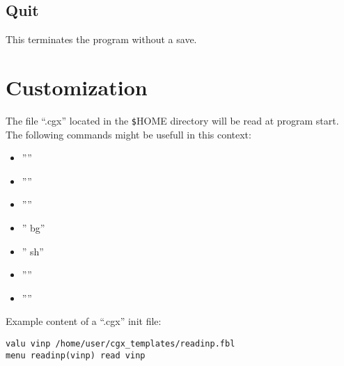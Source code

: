 \documentclass{article}
\begin{document}
\subsection{\label{Quit}Quit}
This terminates the program without a save.

\section{\label{Customization}Customization}
The file ``.cgx'' located in the \verb_$_HOME directory will be read at program start. The following commands might be usefull in this context: 
\begin{itemize}
\item ''''
\item ''''
\item ''''
\item '' bg''
\item '' sh''
\item ''''
\item ''''
\end{itemize}
Example content of a ``.cgx'' init file:
\begin{verbatim}
valu vinp /home/user/cgx_templates/readinp.fbl
menu readinp(vinp) read vinp
\end{verbatim}
\end{document}
